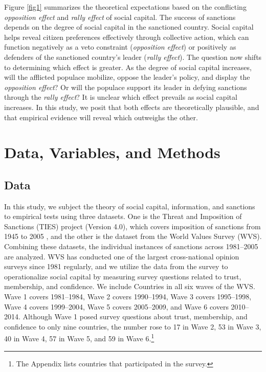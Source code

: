 \documentclass[12pt,]{article}
\begin{document}
Figure \ref{fig1} summarizes the theoretical expectations based on the
conflicting \emph{opposition effect} and \emph{rally effect} of social
capital. The success of sanctions depends on the degree of social
capital in the sanctioned country. Social capital helps reveal citizen
preferences effectively through collective action, which can function
negatively as a veto constraint (\emph{opposition effect}) or positively
as defenders of the sanctioned country's leader (\emph{rally effect}).
The question now shifts to determining which effect is greater. As the
degree of social capital increases, will the afflicted populace
mobilize, oppose the leader's policy, and display the \emph{opposition
effect}? Or will the populace support its leader in defying sanctions
through the \emph{rally effect}? It is unclear which effect prevails as
social capital increases. In this study, we posit that both effects are
theoretically plausible, and that empirical evidence will reveal which
outweighs the other.

\hypertarget{data-variables-and-methods}{%
\section{Data, Variables, and
Methods}\label{data-variables-and-methods}}

\hypertarget{data}{%
\subsection{Data}\label{data}}

In this study, we subject the theory of social capital, information, and
sanctions to empirical tests using three datasets. One is the Threat and
Imposition of Sanctions (TIES) project (Version 4.0), which covers
imposition of sanctions from 1945 to 2005 \citep{morgan2009a}, and the
other is the dataset from the World Values Survey (WVS). Combining these
datasets, the individual instances of sanctions across 1981--2005 are
analyzed. WVS has conducted one of the largest cross-national opinion
surveys since 1981 regularly, and we utilize the data from the survey to
operationalize social capital by measuring survey questions related to
trust, membership, and confidence. We include Countries in all six waves
of the WVS. Wave 1 covers 1981--1984, Wave 2 covers 1990--1994, Wave 3
covers 1995--1998, Wave 4 covers 1999--2004, Wave 5 covers 2005--2009,
and Wave 6 covers 2010--2014. Although Wave 1 posed survey questions
about trust, membership, and confidence to only nine countries, the
number rose to 17 in Wave 2, 53 in Wave 3, 40 in Wave 4, 57 in Wave 5,
and 59 in Wave 6.\footnote{The Appendix lists countries that
  participated in the survey.}
\end{document}
